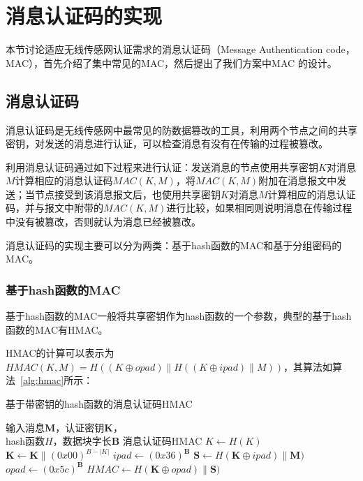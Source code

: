 \section{消息认证码的实现}
本节讨论适应无线传感网认证需求的消息认证码（Message Authentication code，MAC），首先介绍了集中常见的MAC，然后提出了我们方案中MAC 的设计。

\subsection{消息认证码}
消息认证码是无线传感网中最常见的防数据篡改的工具，利用两个节点之间的共享密钥，对发送的消息进行认证，可以检查消息有没有在传输的过程被篡改。

利用消息认证码通过如下过程来进行认证：发送消息的节点使用共享密钥$K$对消息$M$计算相应的消息认证码$MAC(K,M)$，将$MAC(K,M)$附加在消息报文中发送；当节点接受到该消息报文后，也使用共享密钥$K$对消息$M$计算相应的消息认证码，并与报文中附带的$MAC(K,M)$进行比较，如果相同则说明消息在传输过程中没有被篡改，否则就认为消息已经被篡改。

消息认证码的实现主要可以分为两类：基于hash函数的MAC和基于分组密码的MAC。
\subsubsection{基于hash函数的MAC}
基于hash函数的MAC一般将共享密钥作为hash函数的一个参数，典型的基于hash函数的MAC有HMAC。

HMAC的计算可以表示为$HMAC(K,M)=H((K \oplus opad)\| H((K\oplus ipad)\| M))$，其算法如算法~\ref{alg:hmac}所示：
\begin{algorithm}[htbp]
  \caption{基于带密钥的hash函数的消息认证码HMAC}
  \label{alg:hmac}
  \begin{algorithmic}[1]
    \REQUIRE 输入消息$\mathbf{M}$，认证密钥$\mathbf{K}$，\\
            hash函数$H$，数据块字长$\mathbf{B}$
    \ENSURE 消息认证码HMAC
        \STATE $K \leftarrow H(K)$
    \ENDIF
    \STATE $\mathbf{K} \leftarrow \mathbf{K}\| (0x00)^{B-|K|}$
    \STATE $ipad \leftarrow (0x36)^\mathbf{B}$
    \STATE $\mathbf{S} \leftarrow H(\mathbf{K}\oplus ipad)\| \mathbf{M})$
    \STATE $opad \leftarrow (0x5c)^\mathbf{B}$
    \STATE $HMAC \leftarrow H(\mathbf{K}\oplus opad)\| \mathbf{S})$
  \end{algorithmic}
\end{algorithm}

